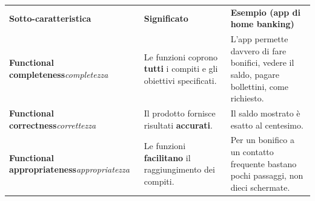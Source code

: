 \begin{table}[H]
\centering
\renewcommand{\arraystretch}{1.4}
\begin{tabularx}{\textwidth}{P{3.6cm} L L}
\textbf{Sotto-caratteristica} & \textbf{Significato} & \textbf{Esempio (app di home banking)} \\
\textbf{Functional completeness}\newline\textit{\small completezza} & Le funzioni coprono \textbf{tutti} i compiti e gli obiettivi specificati. & L'app permette davvero di fare bonifici, vedere il saldo, pagare bollettini, come richiesto. \\
\textbf{Functional correctness}\newline\textit{\small correttezza} & Il prodotto fornisce risultati \textbf{accurati}. & Il saldo mostrato è esatto al centesimo. \\
\textbf{Functional appropriateness}\newline\textit{\small appropriatezza} & Le funzioni \textbf{facilitano} il raggiungimento dei compiti. & Per un bonifico a un contatto frequente bastano pochi passaggi, non dieci schermate. \\
\bottomrule
\end{tabularx}
\end{table}



